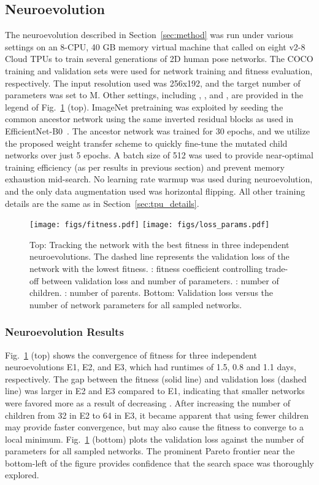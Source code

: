 \documentclass{ieeeaccess}
\begin{document}
\subsection{Neuroevolution}
\label{sec:neuro_details}
The neuroevolution described in Section~\ref{sec:method} was run under various settings on an 8-CPU, 40 GB memory virtual machine that called on eight v2-8 Cloud TPUs to train several generations of 2D human pose networks. The COCO training and validation sets were used for network training and fitness evaluation, respectively. The input resolution used was 256x192, and the target number of parameters  was set to M. Other settings, including , , and , are provided in the legend of Fig.\ \ref{fig:fitness} (top). ImageNet pretraining was exploited by seeding the common ancestor network using the same inverted residual blocks as used in EfficientNet-B0~\cite{tan2019efficientnet}. The ancestor network was trained for 30 epochs, and we utilize the proposed weight transfer scheme to quickly fine-tune the mutated child networks over just 5 epochs. A batch size of 512 was used to provide near-optimal training efficiency (as per results in previous section) and prevent memory exhaustion mid-search. No learning rate warmup was used during neuroevolution, and the only data augmentation used was horizontal flipping. All other training details are the same as in Section~\ref{sec:tpu_details}. 


\begin{figure}
\centering
\texttt{[image: figs/fitness.pdf]}
\texttt{[image: figs/loss\_params.pdf]}
\caption{Top: Tracking the network with the best fitness in three independent neuroevolutions. The dashed line represents the validation loss of the network with the lowest fitness. : fitness coefficient controlling trade-off between validation loss and number of parameters. : number of children. : number of parents. Bottom: Validation loss versus the number of network parameters for all sampled networks.}
\label{fig:fitness}
\end{figure}

\subsubsection{Neuroevolution Results}
Fig.\ \ref{fig:fitness} (top) shows the convergence of fitness for three independent neuroevolutions E1, E2, and E3, which had runtimes of 1.5, 0.8 and 1.1 days, respectively. The gap between the fitness (solid line) and validation loss (dashed line) was larger in E2 and E3 compared to E1, indicating that smaller networks were favored more as a result of decreasing . After increasing the number of children from 32 in E2 to 64 in E3, it became apparent that using fewer children may provide faster convergence, but may also cause the fitness to converge to a local minimum. Fig.\ \ref{fig:fitness} (bottom) plots the validation loss against the number of parameters for all sampled networks. The prominent Pareto frontier near the bottom-left of the figure provides confidence that the search space was thoroughly explored. 
\end{document}
